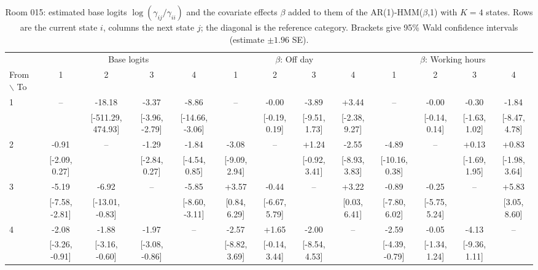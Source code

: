 \begin{table}[ht]
\centering
\begin{adjustbox}{max width=\textwidth}
\begin{tabular}{lcccc|cccc|cccc}
\hline
 & \multicolumn{4}{c}{Base logits} & \multicolumn{4}{c}{$\beta$: Off day} & \multicolumn{4}{c}{$\beta$: Working hours} \\
\cmidrule(lr){2-5} \cmidrule(lr){6-9} \cmidrule(lr){10-13}
From $\backslash$ To & 1 & 2 & 3 & 4 & 1 & 2 & 3 & 4 & 1 & 2 & 3 & 4 \\
\hline
1 & -- & -18.18 & -3.37 & -8.86 & -- & -0.00 & -3.89 & +3.44 & -- & -0.00 & -0.30 & -1.84 \\
 &  & {\footnotesize [-511.29, 474.93]} & {\footnotesize [-3.96, -2.79]} & {\footnotesize [-14.66, -3.06]} &  & {\footnotesize [-0.19, 0.19]} & {\footnotesize [-9.51, 1.73]} & {\footnotesize [-2.38, 9.27]} &  & {\footnotesize [-0.14, 0.14]} & {\footnotesize [-1.63, 1.02]} & {\footnotesize [-8.47, 4.78]} \\
2 & -0.91 & -- & -1.29 & -1.84 & -3.08 & -- & +1.24 & -2.55 & -4.89 & -- & +0.13 & +0.83 \\
 & {\footnotesize [-2.09, 0.27]} &  & {\footnotesize [-2.84, 0.27]} & {\footnotesize [-4.54, 0.85]} & {\footnotesize [-9.09, 2.94]} &  & {\footnotesize [-0.92, 3.41]} & {\footnotesize [-8.93, 3.83]} & {\footnotesize [-10.16, 0.38]} &  & {\footnotesize [-1.69, 1.95]} & {\footnotesize [-1.98, 3.64]} \\
3 & -5.19 & -6.92 & -- & -5.85 & +3.57 & -0.44 & -- & +3.22 & -0.89 & -0.25 & -- & +5.83 \\
 & {\footnotesize [-7.58, -2.81]} & {\footnotesize [-13.01, -0.83]} &  & {\footnotesize [-8.60, -3.11]} & {\footnotesize [0.84, 6.29]} & {\footnotesize [-6.67, 5.79]} &  & {\footnotesize [0.03, 6.41]} & {\footnotesize [-7.80, 6.02]} & {\footnotesize [-5.75, 5.24]} &  & {\footnotesize [3.05, 8.60]} \\
4 & -2.08 & -1.88 & -1.97 & -- & -2.57 & +1.65 & -2.00 & -- & -2.59 & -0.05 & -4.13 & -- \\
 & {\footnotesize [-3.26, -0.91]} & {\footnotesize [-3.16, -0.60]} & {\footnotesize [-3.08, -0.86]} &  & {\footnotesize [-8.82, 3.69]} & {\footnotesize [-0.14, 3.44]} & {\footnotesize [-8.54, 4.53]} &  & {\footnotesize [-4.39, -0.79]} & {\footnotesize [-1.34, 1.24]} & {\footnotesize [-9.36, 1.11]} &  \\
\hline
\end{tabular}
\end{adjustbox}
\caption{Room 015: estimated base logits $\log(\gamma_{ij}/\gamma_{ii})$ and the covariate effects $\beta$ added to them of the AR(1)-HMM($\beta$,1) with $K=4$ states. Rows are the current state $i$, columns the next state $j$; the diagonal is the reference category. Brackets give 95\% Wald confidence intervals (estimate $\pm 1.96$ SE).}
\label{tab:params_working_transition_room_015_calibrated_anchor_ar1_hmm_beta_1_K4}
\end{table}
